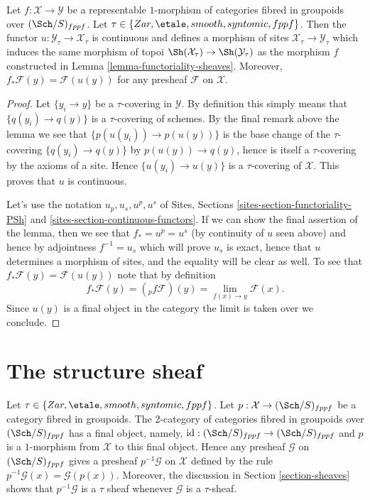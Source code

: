\begin{lemma}
\label{lemma-representable-pushforward}
Let $f : \mathcal{X} \to \mathcal{Y}$ be a representable $1$-morphism of
categories fibred in groupoids over $(\Sch/S)_{fppf}$. Let
$\tau \in \{Zar, \etale, smooth, syntomic, fppf\}$.
Then the functor $u : \mathcal{Y}_\tau \to \mathcal{X}_\tau$ is continuous
and defines a morphism of sites $\mathcal{X}_\tau \to \mathcal{Y}_\tau$
which induces the same morphism of topoi
$\Sh(\mathcal{X}_\tau) \to \Sh(\mathcal{Y}_\tau)$
as the morphism $f$ constructed in
Lemma \ref{lemma-functoriality-sheaves}.
Moreover, $f_*\mathcal{F}(y) = \mathcal{F}(u(y))$ for any presheaf
$\mathcal{F}$ on $\mathcal{X}$.
\end{lemma}

\begin{proof}
Let $\{y_i \to y\}$ be a $\tau$-covering in $\mathcal{Y}$. By definition
this simply means that $\{q(y_i) \to q(y)\}$ is a $\tau$-covering of
schemes. By the final remark above the lemma we see that
$\{p(u(y_i)) \to p(u(y))\}$ is the base change of the $\tau$-covering
$\{q(y_i) \to q(y)\}$ by $p(u(y)) \to q(y)$, hence is itself a
$\tau$-covering by the axioms of a site. Hence $\{u(y_i) \to u(y)\}$
is a $\tau$-covering of $\mathcal{X}$. This proves that $u$ is
continuous.

\medskip\noindent
Let's use the notation $u_p, u_s, u^p, u^s$ of
Sites, Sections \ref{sites-section-functoriality-PSh} and
\ref{sites-section-continuous-functors}.
If we can show the final assertion of the lemma, then we see that
$f_* = u^p = u^s$ (by continuity of $u$ seen above) and hence by adjointness
$f^{-1} = u_s$ which will prove $u_s$ is exact, hence that $u$ determines
a morphism of sites, and the equality will be clear as well.
To see that $f_*\mathcal{F}(y) = \mathcal{F}(u(y))$ note that by
definition
$$
f_*\mathcal{F}(y) = ({}_pf\mathcal{F})(y) =
\lim_{f(x) \to y} \mathcal{F}(x).
$$
Since $u(y)$ is a final object in the category the limit is taken
over we conclude.
\end{proof}





\section{The structure sheaf}
\label{section-structure-sheaf}

\noindent
Let $\tau \in \{Zar, \etale, smooth, syntomic, fppf\}$.
Let $p : \mathcal{X} \to (\Sch/S)_{fppf}$ be a category
fibred in groupoids. The 2-category of categories fibred in groupoids over
$(\Sch/S)_{fppf}$ has a final object, namely,
$\text{id} : (\Sch/S)_{fppf} \to (\Sch/S)_{fppf}$
and $p$ is a $1$-morphism from $\mathcal{X}$ to this final object.
Hence any presheaf $\mathcal{G}$ on $(\Sch/S)_{fppf}$ gives a
presheaf $p^{-1}\mathcal{G}$ on $\mathcal{X}$ defined by the rule
$p^{-1}\mathcal{G}(x) = \mathcal{G}(p(x))$. Moreover, the discussion in
Section \ref{section-sheaves}
shows that $p^{-1}\mathcal{G}$ is a $\tau$ sheaf whenever
$\mathcal{G}$ is a $\tau$-sheaf.

